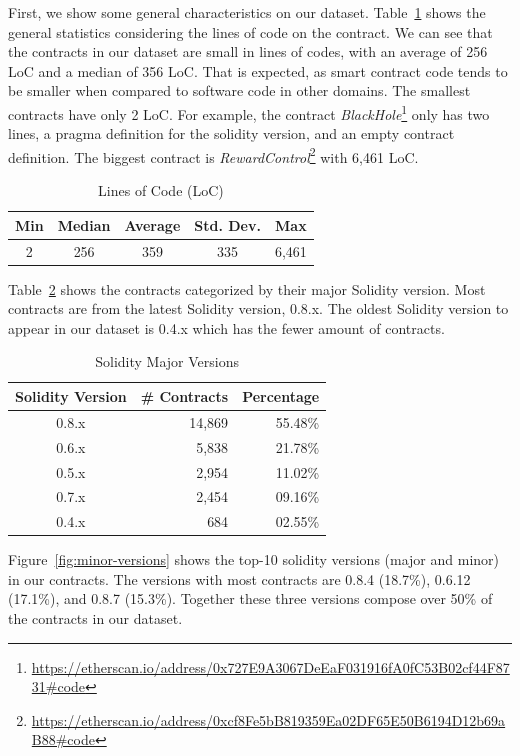 \documentclass[10pt,conference]{IEEEtran}
\begin{document}
First, we show some general characteristics on our dataset.
Table~\ref{tab:loc} shows the general statistics considering the lines of code on the contract. We can see that the contracts in our dataset are small in lines of codes, with an average of 256 LoC and a median of 356 LoC. That is expected, as smart contract code tends to be smaller when compared to software code in other domains.  The smallest contracts have only 2 LoC.  For example, the contract \textit{BlackHole}\footnote{\url{https://etherscan.io/address/0x727E9A3067DeEaF031916fA0fC53B02cf44F8731\#code}} only has two lines, a pragma definition for the solidity version, and an empty contract definition. The biggest contract is \textit{RewardControl}\footnote{\url{https://etherscan.io/address/0xcf8Fe5bB819359Ea02DF65E50B6194D12b69aB88\#code}} with 6,461 LoC. 

\begin{table}
\center
  \caption{Lines of Code (LoC)}
  \label{tab:loc}
  \begin{tabular}{c c c c c}
    \hline
    Min & Median & Average & Std. Dev. & Max \\
    \hline
   2 & 256 & 359 & 335 & 6,461 \\
  \hline
\end{tabular}
\end{table}


Table~\ref{tab:major-versions} shows the contracts categorized by their major Solidity version. Most contracts are from the latest Solidity version, 0.8.x. The oldest Solidity version to appear in our dataset is 0.4.x which has the fewer amount of contracts.

\begin{table}
\center
  \caption{Solidity Major Versions}
  \label{tab:major-versions}
  \begin{tabular}{crr}
    \hline
    Solidity Version & \# Contracts & Percentage\\
    \hline
    0.8.x & 14,869 &55.48\%\\
    0.6.x & 5,838 &21.78\%\\
    0.5.x & 2,954 &11.02\%\\
    0.7.x & 2,454 &09.16\%\\
    0.4.x & 684 &02.55\%\\
  \hline
\end{tabular}
\end{table}

Figure~\ref{fig:minor-versions} shows the top-10 solidity versions (major and minor) in our contracts. The versions with most contracts are 0.8.4 (18.7\%), 0.6.12 (17.1\%), and 0.8.7 (15.3\%). Together these three versions compose over 50\% of the contracts in our dataset.
\end{document}

